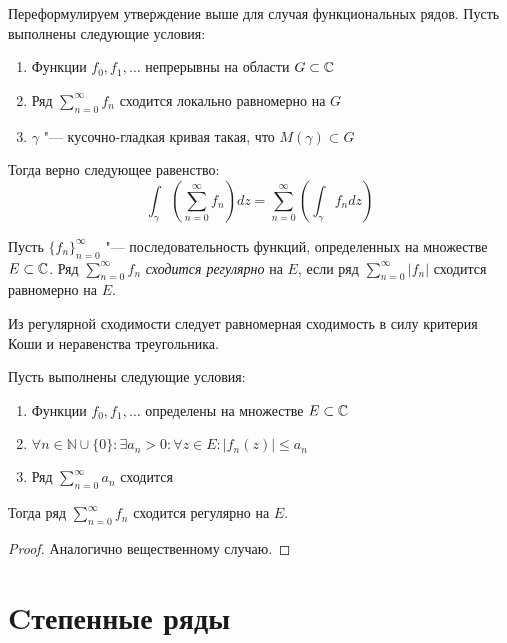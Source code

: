 \begin{note}
	Переформулируем утверждение выше для случая функциональных рядов. Пусть выполнены следующие условия:
	\begin{enumerate}
		\item Функции $f_0, f_1, \dotsc$ непрерывны на области $G \subset \mathbb{C}$
		\item Ряд $\sum_{n=0}^\infty f_n$ сходится локально равномерно на $G$
		\item $\gamma$ "--- кусочно-гладкая кривая такая, что $M(\gamma) \subset G$
	\end{enumerate}
	
	Тогда верно следующее равенство:
	\[\int_\gamma \left(\sum_{n=0}^\infty f_n\right)dz = \sum_{n=0}^\infty \left(\int_\gamma f_ndz\right)\]
\end{note}

\begin{definition}
	Пусть $\{f_n\}_{n = 0}^\infty$ "--- последовательность функций, определенных на множестве $E \subset \mathbb{C}$. Ряд $\sum_{n=0}^\infty f_n$ \textit{сходится регулярно} на $E$, если ряд $\sum_{n=0}^\infty |f_n|$ сходится равномерно на $E$.
\end{definition}

\begin{note}
	Из регулярной сходимости следует равномерная сходимость в силу критерия Коши и неравенства треугольника.
\end{note}

\begin{theorem}
	Пусть выполнены следующие условия:
	\begin{enumerate}
		\item Функции $f_0, f_1, \dotsc$ определены на множестве $E \subset \mathbb{C}$
		\item $\forall n \in \mathbb{N} \cup \{0\} : \exists a_n > 0: \forall z \in E: |f_n(z)| \le a_n$
		\item Ряд $\sum_{n=0}^\infty a_n$ сходится
	\end{enumerate}
	
	Тогда ряд $\sum_{n=0}^\infty f_n$ сходится регулярно на $E$.
\end{theorem}

\begin{proof}
	Аналогично вещественному случаю.
\end{proof}

\section{Cтепенные ряды}

